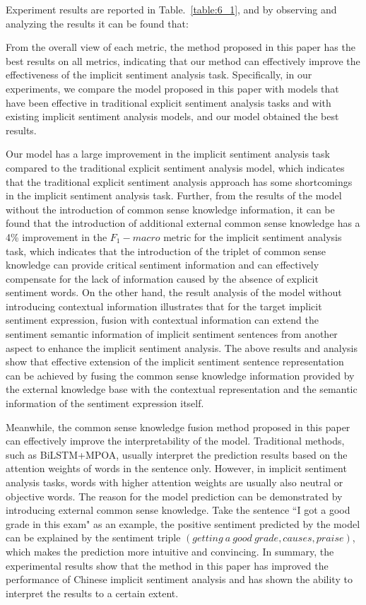 Experiment results are reported in Table.~\ref{table:6_1}, and by observing and analyzing the results it can be found that:

From the overall view of each metric, the method proposed in this paper has the best results on all metrics, indicating that our method can effectively improve the effectiveness of the implicit sentiment analysis task. Specifically, in our experiments, we compare the model proposed in this paper with models that have been effective in traditional explicit sentiment analysis tasks and with existing implicit sentiment analysis models, and our model obtained the best results.

Our model has a large improvement in the implicit sentiment analysis task compared to the traditional explicit sentiment analysis model, which indicates that the traditional explicit sentiment analysis approach has some shortcomings in the implicit sentiment analysis task.
Further, from the results of the model without the introduction of common sense knowledge information, it can be found that the introduction of additional external common sense knowledge has a 4\% improvement in the $F_1-macro$ metric for the implicit sentiment analysis task, which indicates that the introduction of the triplet  of common sense knowledge can provide critical sentiment information and can effectively compensate for the lack of information caused by the absence of explicit sentiment words.
On the other hand, the result analysis of the model without introducing contextual information illustrates that for the target implicit sentiment expression, fusion with contextual information can extend the sentiment semantic information of implicit sentiment sentences from another aspect to enhance the implicit sentiment analysis.
The above results and analysis show that effective extension of the implicit sentiment sentence representation can be achieved by fusing the common sense knowledge information provided by the external knowledge base with the contextual representation and the semantic information of the sentiment expression itself.

Meanwhile, the common sense knowledge fusion method proposed in this paper can effectively improve the interpretability of the model. Traditional methods, such as BiLSTM+MPOA, usually interpret the prediction results based on the attention weights of words in the sentence only. However, in implicit sentiment analysis tasks, words with higher attention weights are usually also neutral or objective words. The reason for the model prediction can be demonstrated by introducing external common sense knowledge. Take the sentence ``I got a good grade in this exam" as an example, the positive sentiment predicted by the model can be explained by the sentiment triple $(getting\ a\ good\ grade, causes, praise)$, which makes the prediction more intuitive and convincing.
In summary, the experimental results show that the method in this paper has improved the performance of Chinese implicit sentiment analysis and has shown the ability to interpret the results to a certain extent.

